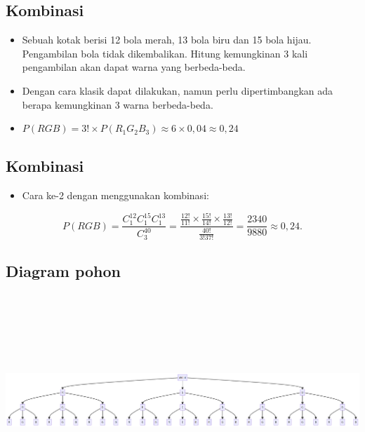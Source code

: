 \documentclass[
  letterpaper,
  DIV=11,
  numbers=noendperiod]{scrartcl}
\providecommand{\tightlist}{%
  \setlength{\itemsep}{0pt}\setlength{\parskip}{0pt}}\usepackage{longtable,booktabs,array}
\begin{document}
\subsection{Kombinasi}\label{kombinasi-1}

\begin{itemize}
\item
  Sebuah kotak berisi 12 bola merah, 13 bola biru dan 15 bola hijau.
  Pengambilan bola tidak dikembalikan. Hitung kemungkinan 3 kali
  pengambilan akan dapat warna yang berbeda-beda.
\item
  Dengan cara klasik dapat dilakukan, namun perlu dipertimbangkan ada
  berapa kemungkinan 3 warna berbeda-beda.
\item
  \(P(RGB)=3! \times P(R_1G_2B_3)\approx6\times0,04\approx0,24\)
\end{itemize}

\subsection{Kombinasi}\label{kombinasi-2}

\begin{itemize}
\tightlist
\item
  Cara ke-2 dengan menggunakan kombinasi:
\end{itemize}

\[
P(RGB)=\frac{C^{12}_1C^{15}_1C^{13}_1}{C^{40}_3}=\frac{\frac{12!}{11!}\times\frac{15!}{14!}\times\frac{13!}{12!}}{\frac{40!}{3!37!}}=\frac{2340}{9880}\approx0,24.
\]

\subsection{Diagram pohon}\label{diagram-pohon}

\includegraphics[width=20.66in,height=3.15in]{index_files/figure-latex/mermaid-figure-1.png}
\end{document}
